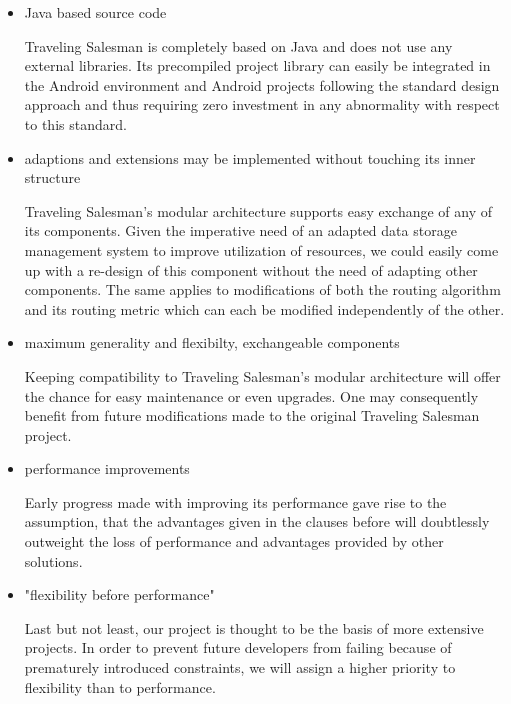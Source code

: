 \begin{itemize}
	\item Java based source code
	
		Traveling Salesman is completely based on Java and does not use any external libraries. Its precompiled project library can easily be integrated in the Android environment and Android projects following the standard design approach and thus requiring zero investment in any abnormality with respect to this standard.
	
	\item adaptions and extensions may be implemented without touching its inner structure
	
		Traveling Salesman's modular architecture supports easy exchange of any of its components. Given the imperative need of an adapted data storage management system to improve utilization of resources, we could easily come up with a re-design of this component without the need of adapting other components. The same applies to modifications of both the routing algorithm and its routing metric which can each be modified independently of the other.
	
	\item maximum generality and flexibilty, exchangeable components
	
		Keeping compatibility to Traveling Salesman's modular architecture will offer the chance for easy maintenance or even upgrades. One may consequently benefit from future modifications made to the original Traveling Salesman project.
	
	\item performance improvements
	
		Early progress made with improving its performance gave rise to the assumption, that the advantages given in the clauses before will doubtlessly outweight the loss of performance and advantages provided by other solutions.
		
	\item "flexibility before performance"
	
		Last but not least, our project is thought to be the basis of more extensive projects. In order to prevent future developers from failing because of prematurely introduced constraints, we will assign a higher priority to flexibility than to performance.
	
\end{itemize}